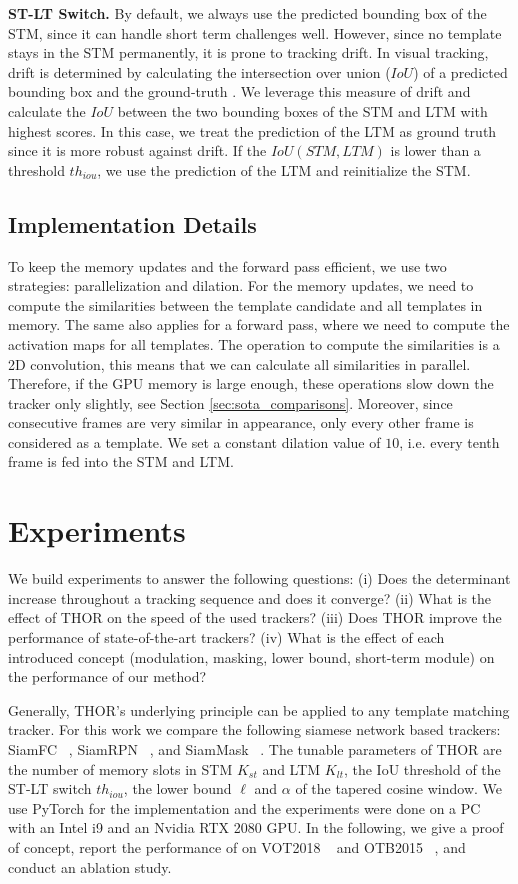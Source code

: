 \documentclass{article}
\begin{document}
\textbf{ST-LT Switch.} By default, we always use the predicted bounding box of the STM, since it can handle short term challenges well. However, since no template stays in the STM permanently, it is prone to tracking drift. In visual tracking, drift is determined by calculating the intersection over union ($IoU$) of a predicted bounding box and the ground-truth \cite{VOT_TPAMI}. We leverage this measure of drift and calculate the $IoU$ between the two bounding boxes of the STM and LTM with highest scores. In this case, we treat the prediction of the LTM as ground truth since it is more robust against drift. If the $IoU(STM, LTM)$ is lower than a threshold $th_{iou}$, we use the prediction of the LTM and reinitialize the STM.

\subsection{Implementation Details}
To keep the memory updates and the forward pass efficient, we use two strategies: parallelization and dilation. For the memory updates, we need to compute the similarities between the template candidate and all templates in memory. The same also applies for a forward pass, where we need to compute the activation maps for all templates. The operation to compute the similarities is a 2D convolution, this means that we can calculate all similarities in parallel. Therefore, if the GPU memory is large enough, these operations slow down the tracker only slightly, see Section \ref{sec:sota_comparisons}. Moreover, since consecutive frames are very similar in appearance, only every other frame is considered as a template. We set a constant dilation value of $10$, i.e. every tenth frame is fed into the STM and LTM. 


\section{Experiments}
We build experiments to answer the following questions: (i) Does the determinant increase throughout a tracking sequence and does it converge? (ii) What is the effect of THOR on the speed of the used trackers? (iii) Does THOR improve the performance of state-of-the-art trackers? (iv) What is the effect of each introduced concept (modulation, masking, lower bound, short-term module) on the performance of our method?

Generally, THOR's underlying principle can be applied to any template matching tracker. For this work we compare the following siamese network based trackers: SiamFC ~\cite{bertinetto2016fully}, SiamRPN ~\cite{li2018high}, and SiamMask ~\cite{wang2018fast}. The tunable parameters of THOR are the number of memory slots in STM $K_{st}$ and LTM $K_{lt}$, the IoU threshold of the ST-LT switch $th_{iou}$, the lower bound $\ell$ and $\alpha$ of the tapered cosine window. We use PyTorch for the implementation and the experiments were done on a PC with an Intel i9 and an Nvidia RTX 2080 GPU. In the following, we give a proof of concept, report the performance of on VOT2018 ~\cite{VOT_TPAMI} and OTB2015 ~\cite{OTB2015}, and conduct an ablation study. 
\end{document}
